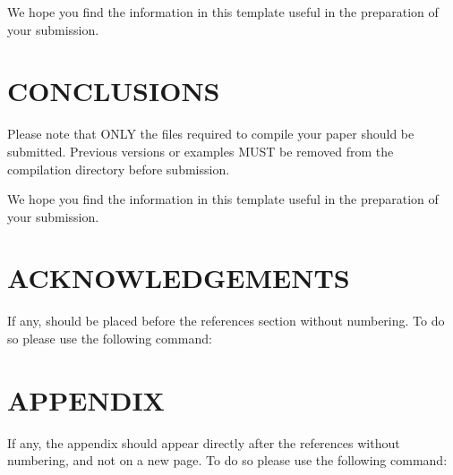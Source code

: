 \documentclass[a4paper,twoside]{article}
\begin{document}
We hope you find the information in this template useful in the preparation of your submission.

\section{\uppercase{CONCLUSIONS}}
\label{sec:conclusions}

Please note that ONLY the files required to compile your paper should be submitted. Previous versions or examples MUST be removed from the compilation directory before submission.

We hope you find the information in this template useful in the preparation of your submission.

\section*{\uppercase{Acknowledgements}}

If any, should be placed before the references section
without numbering. To do so please use the following command:




{\small
}


\section*{\uppercase{Appendix}}

If any, the appendix should appear directly after the
references without numbering, and not on a new page. To do so please use the following command:
\end{document}
